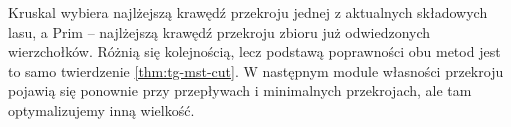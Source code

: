 \begin{uwaga}
Kruskal wybiera najlżejszą
krawędź przekroju jednej
z aktualnych składowych lasu,
a Prim -- najlżejszą krawędź
przekroju zbioru już
odwiedzonych wierzchołków.
Różnią się kolejnością,
lecz podstawą poprawności
obu metod jest to samo
twierdzenie \ref{thm:tg-mst-cut}.
W następnym module
własności przekroju
pojawią się ponownie
przy przepływach
i minimalnych przekrojach,
ale tam optymalizujemy
inną wielkość.
\end{uwaga}
